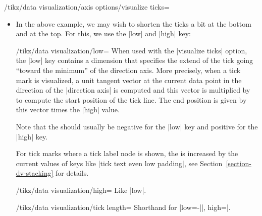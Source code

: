 \begin{key}{/tikz/data visualization/axis options/visualize ticks=}
\begin{itemize}
\begin{codeexample}[]
\tikz \datavisualization [
    our system,
    x axis={attribute=time, length=3cm, ticks=many},
    left axis ={attribute=money},
    right axis={attribute=people},
    visualize as line/.list={people 1, people 2, money 1, money 2}]
  data set {people and money};  
\end{codeexample}    
  \item In the above example, we may wish to shorten the ticks a bit
    at the bottom and at the top. For this, we use the |low| and
    |high| key:
    \begin{key}{/tikz/data visualization/low=}
      When used with the |visualize ticks| option, the |low| key
      contains a dimension that specifies the extend of the tick going
      ``toward the minimum'' of the direction axis. More precisely, when a tick
      mark is visualized, a unit tangent vector at the current data point
      in the direction of the |direction axis| is computed and this
      vector is multiplied by  to compute the start
      position of the tick line. The end position is given by this
      vector times the |high| value.

      Note that the  should usually be negative for
      the |low| key and positive for the |high| key.

      For tick marks where a tick label node is shown, the
       is increased by the current values of keys like
      |tick text even low padding|, see
      Section~\ref{section-dv-stacking} for details.
    \end{key}
    \begin{key}{/tikz/data visualization/high=}
      Like |low|.
    \end{key}
    \begin{key}{/tikz/data visualization/tick length=}
      Shorthand for |low=-||, high=|.
    \end{key}
    

\end{itemize}
\end{key}
